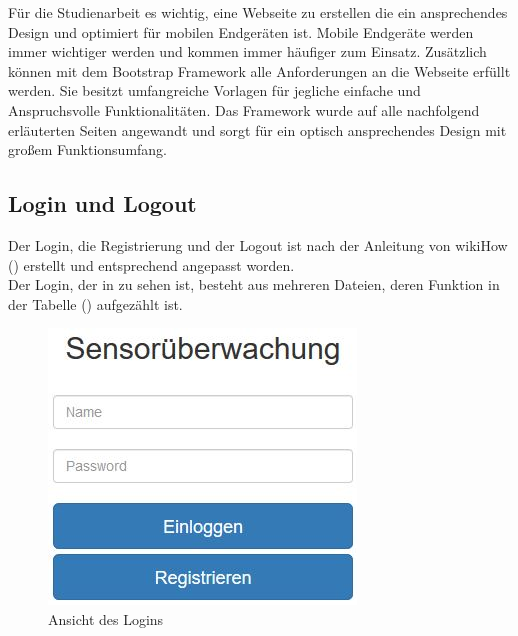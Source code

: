 Für die Studienarbeit es wichtig, eine Webseite zu erstellen die ein ansprechendes Design und optimiert für mobilen Endgeräten ist. Mobile Endgeräte werden immer wichtiger werden und kommen immer häufiger zum Einsatz. Zusätzlich können mit dem Bootstrap Framework alle Anforderungen an die Webseite erfüllt werden. Sie besitzt umfangreiche Vorlagen für jegliche einfache und Anspruchsvolle Funktionalitäten. Das Framework wurde auf alle nachfolgend erläuterten Seiten angewandt und sorgt für ein optisch ansprechendes Design mit großem Funktionsumfang.  
\subsection{Login und Logout}\label{login}

Der Login, die Registrierung und der Logout ist nach der Anleitung von
wikiHow (\cite{PHP-Login:online}) erstellt und entsprechend angepasst worden. 
\\
Der Login, der in  zu sehen ist, besteht aus mehreren Dateien, deren Funktion in der Tabelle
() aufgezählt ist.

\begin{figure} [htb]
\begin{centering}
\includegraphics{Bilder/Kapitel4/login.jpg}
\caption[Ansicht des Logins]{Ansicht des Logins}
\label{pic:login}
\end{centering}
\end{figure}

